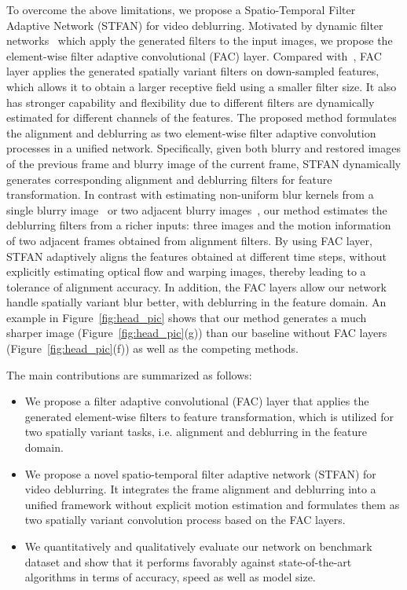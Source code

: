 \documentclass[10pt,twocolumn,letterpaper]{article}
\begin{document}
To overcome the above limitations, we propose a Spatio-Temporal Filter Adaptive Network (STFAN) for video deblurring.
Motivated by dynamic filter networks~\cite{jia2016dynamic, niklaus2017video, mildenhall2018burst} which apply the generated filters to the input images,
we propose the element-wise filter adaptive convolutional (FAC) layer.
Compared with~\cite{jia2016dynamic, niklaus2017video, mildenhall2018burst}, FAC layer applies the generated spatially variant filters on down-sampled features, which allows it to obtain a larger receptive field using a smaller filter size.
It also has stronger capability and flexibility due to different filters are dynamically estimated for different channels of the features.
The proposed method formulates the alignment and deblurring as two element-wise filter adaptive convolution processes in a unified network.
Specifically, given both blurry and restored images of the previous frame and blurry image of the current frame,
STFAN dynamically generates corresponding alignment and deblurring filters for feature transformation.
In contrast with estimating non-uniform blur kernels from a single blurry image~\cite{zhang2018dynamic, gong2017motion, sun2015learning, hyun2014segmentation} or two adjacent blurry images~\cite{hyun2015generalized}, 
our method estimates the deblurring filters from a richer inputs: three images and the motion information of two adjacent frames obtained from alignment filters.
By using FAC layer, STFAN adaptively aligns the features obtained at different time steps, without explicitly estimating optical flow and warping images, 
thereby leading to a tolerance of alignment accuracy.
In addition, the FAC layers allow our network handle spatially variant blur better, with deblurring in the feature domain.
An example in Figure~\ref{fig:head_pic} shows that our method generates a much sharper image (Figure~\ref{fig:head_pic}(g)) than our baseline without FAC layers (Figure~\ref{fig:head_pic}(f)) as well as the competing methods.


The main contributions are summarized as follows:
\vspace{-3pt}
\begin{itemize}
\setlength{\itemsep}{3pt}
\setlength{\parsep}{0pt}
\setlength{\parskip}{3pt}
\item We propose a filter adaptive convolutional (FAC) layer that applies the generated element-wise filters to feature transformation, which is utilized for two spatially variant tasks, i.e. alignment and deblurring in the feature domain.
\item We propose a novel spatio-temporal filter adaptive network (STFAN) for video deblurring. It integrates the frame alignment and deblurring into a unified framework without explicit motion estimation and formulates them as two spatially variant convolution process based on the FAC layers.
\item We quantitatively and qualitatively evaluate our network on benchmark dataset and show that it performs favorably against state-of-the-art algorithms in terms of accuracy, speed as well as model size.
\end{itemize}
\end{document}
